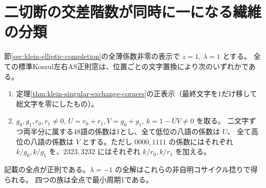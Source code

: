 \section{二切断の交差階数が同時に一になる繊維の分類}
\label{sec:klein-double-exchange-fourier}
\begin{theorem}\label{thm:full-thin-double-exchange}
節\ref{sec:klein-elliptic-completion}の全薄係数非零の表示で $z=1$, $\lambda=1$ とする。
全ての標準Koszul左右AS正則窓は、位置ごとの文字置換により次のいずれかである。
\begin{enumerate}
\item 定理\ref{thm:klein-singular-exchange-corners}の正表示（最終文字を1だけ移して総文字を零にしたもの）。
\item $g_0,g_1,r_0,r_1\ne0$, $U=r_0+r_1,V=g_0+g_1$, $k=1-UV\ne0$ を取る。
二文字ずつ両半分に属する48語の係数は1とし、全て低位の八語の係数は $U$、
全て高位の八語の係数は $V$ とする。ただし $0000,1111$ の係数にはそれぞれ
$k/g_0,k/g_1$ を、$2323,3232$ にはそれぞれ $k/r_0,k/r_1$ を加える。
\end{enumerate}
記載の全点が正則である。$\lambda=-1$ の全解はこれらの非自明コサイクル捻りで得られる。
四つの族は全点で最小周期1である。
\end{theorem}
